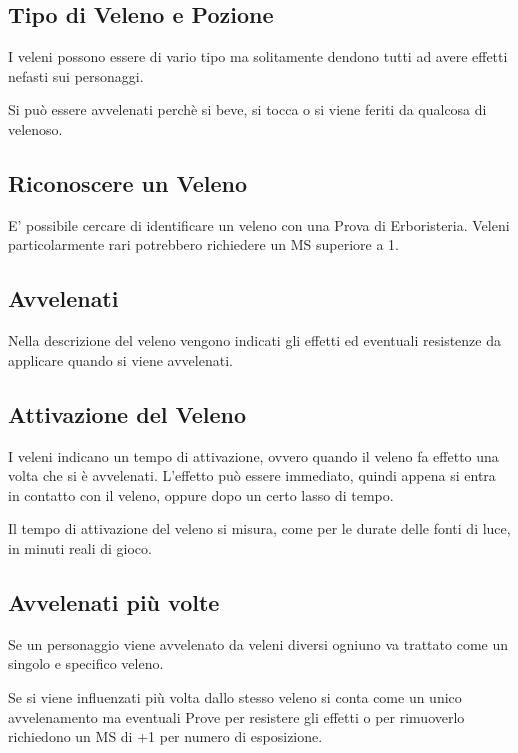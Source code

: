 \documentclass[12pt,a4paper,twoside,openany]{book}
\begin{document}
\begin{multicols}{2}

\subsection{Tipo di Veleno e Pozione}\label{tipidiveleno}

I veleni possono essere di vario tipo ma solitamente dendono tutti ad avere effetti nefasti sui personaggi.

Si può essere avvelenati perchè si beve, si tocca o si viene feriti da qualcosa di velenoso.

\subsection{Riconoscere un Veleno}

E' possibile cercare di identificare un veleno con una Prova di Erboristeria. Veleni particolarmente rari potrebbero richiedere un MS superiore a 1.

\subsection{Avvelenati}

Nella descrizione del veleno vengono indicati gli effetti ed eventuali resistenze da applicare quando si viene avvelenati.

\subsection{Attivazione del Veleno}

I veleni indicano un tempo di attivazione, ovvero quando il veleno fa effetto una volta che si è avvelenati. L'effetto può essere immediato, quindi appena si entra in contatto con il veleno, oppure dopo un certo lasso di tempo.

Il tempo di attivazione del veleno si misura, come per le durate delle fonti di luce, in minuti reali di gioco.

\subsection{Avvelenati più volte}

Se un personaggio viene avvelenato da veleni diversi ogniuno va trattato come un singolo e specifico veleno.

Se si viene influenzati più volta dallo stesso veleno si conta come un unico avvelenamento ma eventuali Prove per resistere gli effetti o per rimuoverlo richiedono un MS di +1 per numero di esposizione.


\end{multicols}
\end{document}
